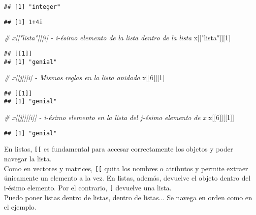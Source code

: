 \documentclass[]{article}
\newenvironment{Shaded}{\begin{snugshade}}{\end{snugshade}}
\newcommand{\DecValTok}[1]{\textcolor[rgb]{0.00,0.00,0.81}{#1}}
\newcommand{\StringTok}[1]{\textcolor[rgb]{0.31,0.60,0.02}{#1}}
\newcommand{\CommentTok}[1]{\textcolor[rgb]{0.56,0.35,0.01}{\textit{#1}}}
\newcommand{\OperatorTok}[1]{\textcolor[rgb]{0.81,0.36,0.00}{\textbf{#1}}}
\newcommand{\NormalTok}[1]{#1}
\begin{document}
\begin{verbatim}
## [1] "integer"
\end{verbatim}

\begin{Shaded}
\end{Shaded}

\begin{verbatim}
## [1] 1+4i
\end{verbatim}

\begin{Shaded}
\begin{Highlighting}[]
\CommentTok{# x[["lista"]][i] - i-ésimo elemento de la lista dentro de la lista }
\NormalTok{x[[}\StringTok{"lista"}\NormalTok{]][}\DecValTok{1}\NormalTok{]}
\end{Highlighting}
\end{Shaded}

\begin{verbatim}
## [[1]]
## [1] "genial"
\end{verbatim}

\begin{Shaded}
\begin{Highlighting}[]
\CommentTok{# x[[j]][i] - Mismas reglas en la lista anidada}
\NormalTok{x[[}\DecValTok{6}\NormalTok{]][}\DecValTok{1}\NormalTok{]}
\end{Highlighting}
\end{Shaded}

\begin{verbatim}
## [[1]]
## [1] "genial"
\end{verbatim}

\begin{Shaded}
\begin{Highlighting}[]
\CommentTok{# x[[j]][[i]] - i-ésimo elemento en la lista del j-ésimo elemento de x}
\NormalTok{x[[}\DecValTok{6}\NormalTok{]][[}\DecValTok{1}\NormalTok{]]}
\end{Highlighting}
\end{Shaded}

\begin{verbatim}
## [1] "genial"
\end{verbatim}

\begin{nota}
En listas, \texttt{[[} es fundamental para accesar correctamente los objetos y 
poder navegar la lista. \\

Como en vectores y matrices, \texttt{[[} quita los nombres o atributos y permite extraer únicamente un elemento a la vez. En listas, además, devuelve el objeto dentro 
del i-ésimo elemento. Por el contrario, \texttt{[} devuelve una lista.\\

Puedo poner listas dentro de listas, dentro de listas... Se navega en orden
como en el ejemplo.
\end{nota}
\end{document}
